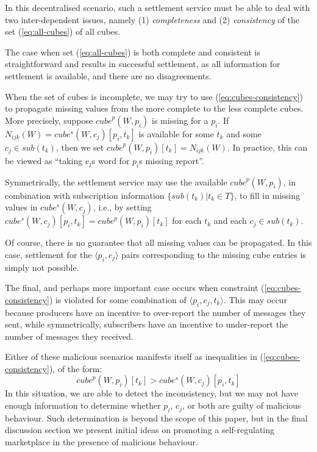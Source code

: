 \documentclass[conference]{IEEEtran}
\begin{document}
In this decentralised scenario, such a settlement service must be able to deal with two inter-dependent issues, namely (1) \textit{completeness} and (2) \textit{consistency} of the set (\ref{eq:all-cubes}) of all cubes.

The case when set (\ref{eq:all-cubes}) is both complete and consistent is straightforward and results in successful settlement, as all information for settlement is available, and there are no disagreements.

When the set of cubes is incomplete, we may try to use (\ref{eq:cubes-consistency}) to propagate missing values from the more complete to the less complete cubes. 
More precisely, suppose $ \mathit{cube}^p(W, p_i) $ is missing for a $p_i$.
If $ N_{ijk}(W) = \mathit{cube^s}(W, c_j)[p_i, t_k] $ is available for some $t_k$ and some $ c_j \in \mathit{sub}(t_k) $, then we set $  \mathit{cube}^p(W, p_i)[t_k]=  N_{ijk}(W) $.
In practice, this can be viewed as ``taking $ c_j $s word for $p_i$s missing report''.

Symmetrically, the settlement service may use the available $ \mathit{cube}^p(W, p_i)$, in combination with subscription information $ \{\mathit{sub}(t_k) | t_k \in T \}$, to fill in missing values in 
$  \mathit{cube^s}(W, c_j)  $, i.e., by setting 
$ \mathit{cube^s}(W, c_j)[p_i, t_k]  =  \mathit{cube}^p(W, p_i)[t_k]$ for each $t_k$ and each $c_j \in \mathit{sub}(t_k)$.

Of course, there is no guarantee that all missing values can be propagated. 
In this case, settlement for the $\langle p_i, c_j \rangle$ pairs corresponding to the missing cube entries is simply not possible.

The final, and perhaps more important case occurs when constraint (\ref{eq:cubes-consistency}) is violated for some combination of $\langle p_i, c_j, t_k \rangle$.
This may occur because producers have an incentive to over-report the number of messages they sent, while symmetrically, subscribers have an incentive to under-report the number of messages they received.

Either of these malicious scenarios manifests itself as inequalities in (\ref{eq:cubes-consistency}), of the form:
\begin{equation}\label{eq:inconsistencies}
\mathit{cube}^p(W, p_i)[t_k] > \mathit{cube^s}(W, c_j)[p_i, t_k]
\end{equation}
In this situation, we are able to detect the inconsistency, but we may not have enough information to determine whether $p_i$, $c_j$, or both are guilty of malicious behaviour.
Such determination is beyond the scope of this paper, but in the final discussion section we present initial ideas on promoting a self-regulating marketplace in the presence of malicious behaviour.
\end{document}
